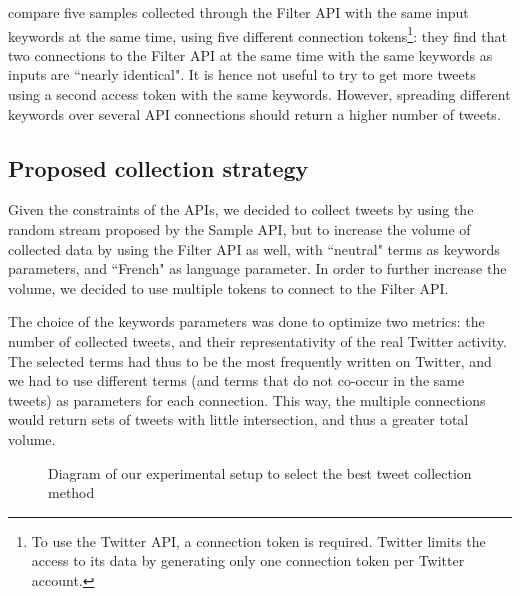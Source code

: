 \citet{joseph_two_2014} compare five samples collected through the Filter API with the same input keywords at the same time, using five different connection tokens\footnote{To use the Twitter API, a connection token is required. Twitter limits the access to its data by generating only one connection token per Twitter account.}: they find that two connections to the Filter API at the same time with the same keywords as inputs are ``nearly identical". It is hence not useful to try to get more tweets using a second access token with the same keywords. However, spreading different keywords over several API connections should return a higher number of tweets.

			\subsection{Proposed collection strategy \label{Subsec: collection strategy}}

Given the constraints of the APIs, we decided to collect tweets by using the random stream proposed by the Sample API, but to increase the volume of collected data by using the Filter API as well, with ``neutral" terms as keywords parameters, and ``French" as language parameter.  In order to further increase the volume, we decided to use multiple tokens to connect to the Filter API. 



The choice of the keywords parameters was done to optimize two metrics: the number of collected tweets, and their representativity of the real Twitter activity. The selected terms had thus to be the most frequently written on Twitter, and we had to use different terms (and terms that do not co-occur in the same tweets) as parameters for each connection. This way, the multiple connections would return sets of tweets with little intersection, and thus a greater total volume.


\begin{figure}
\caption{Diagram of our experimental setup to select the best tweet collection method}
\label{Figure:ExperimentalSetup}
\end{figure}

